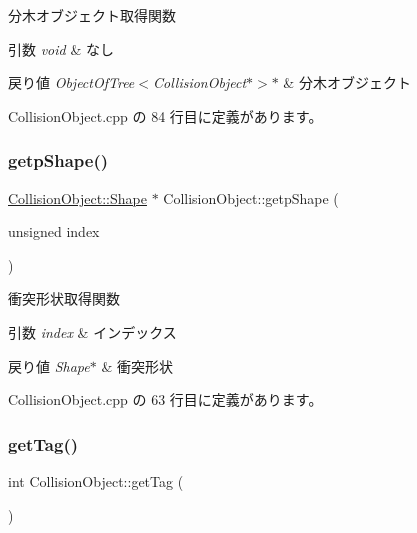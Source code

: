 分木オブジェクト取得関数 


\begin{DoxyParams}{引数}
{\em void} & なし \\
\hline
\end{DoxyParams}

\begin{DoxyRetVals}{戻り値}
{\em Object\+Of\+Tree$<$\+Collision\+Object$\ast$$>$$\ast$} & 分木オブジェクト \\
\hline
\end{DoxyRetVals}


 Collision\+Object.\+cpp の 84 行目に定義があります。

\mbox{\label{class_collision_object_ab3531b5579d3759c67a38e1485ace2e2}} 
\subsubsection{\texorpdfstring{getp\+Shape()}{getpShape()}}
{\footnotesize\ttfamily \mbox{\hyperlink{class_collision_object_1_1_shape}{Collision\+Object\+::\+Shape}} $\ast$ Collision\+Object\+::getp\+Shape (\begin{DoxyParamCaption}\item[{unsigned}]{index }\end{DoxyParamCaption})}



衝突形状取得関数 


\begin{DoxyParams}{引数}
{\em index} & インデックス \\
\hline
\end{DoxyParams}

\begin{DoxyRetVals}{戻り値}
{\em Shape$\ast$} & 衝突形状 \\
\hline
\end{DoxyRetVals}


 Collision\+Object.\+cpp の 63 行目に定義があります。

\mbox{\label{class_collision_object_a0a34797b95ae9bc9908f95ed51caffbb}} 
\subsubsection{\texorpdfstring{get\+Tag()}{getTag()}}
{\footnotesize\ttfamily int Collision\+Object\+::get\+Tag (\begin{DoxyParamCaption}{ }\end{DoxyParamCaption})}



